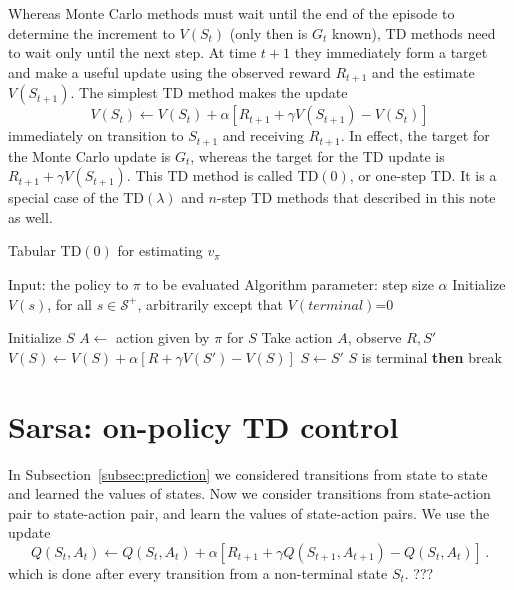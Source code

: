 \documentclass[12pt]{book}
\newcommand{\<}{\langle}
\renewcommand{\>}{\rangle}
\renewcommand{\S}{\mathcal{S}}
\begin{document}
Whereas Monte Carlo methods must wait until the end of the episode to determine the increment to $V(S_t)$ (only then is $G_t$ known), TD methods need to wait only until the next step.
At time $t+1$ they immediately form a target and make a useful update using the observed reward $R_{t+1}$ and the estimate $V(S_{t+1})$. The simplest TD method makes the update 
\begin{equation}
V(S_t) \leftarrow V(S_t) + \alpha [ R_{t+1} + \gamma V(S_{t+1}) - V(S_t)]
\end{equation}
immediately on transition to $S_{t+1}$ and receiving $R_{t+1}$. In effect, the target for the Monte Carlo update is $G_t$, whereas the target for the TD update is $R_{t+1} + \gamma V(S_{t+1})$. This TD method is called TD$(0)$, or one-step TD. It is a special case of the TD$(\lambda)$ and $n$-step TD methods that described in this note as well.

\begin{algorithm}
\caption{Tabular TD$(0)$ for estimating $v_\pi$}
\begin{algorithmic}
\State Input: the policy to $\pi$ to be evaluated
\State Algorithm parameter: step size $\alpha$
\State Initialize $V(s)$, for all $s\in\S^+$, arbitrarily except that $V(terminal)$=0

\medskip
{}
  \State Initialize $S$
    \State $A\leftarrow$ action given by $\pi$ for $S$
    \State Take action $A$, observe $R,S'$
    \State $V(S)\leftarrow V(S) + \alpha [R + \gamma V(S') - V(S)]$
    \State $S\leftarrow S'$
     $S$ is terminal {\bf then} break
  \EndFor
\EndFor
\end{algorithmic}
\end{algorithm}

%
%
%

\section{Sarsa: on-policy TD control}

In Subsection~\ref{subsec:prediction} we considered transitions from state to state and learned the values of states. Now we consider transitions from state-action pair to state-action pair, and learn the values of
state-action pairs. We use the update
\begin{equation}
Q(S_t,A_t)\leftarrow Q(S_t,A_t) + \alpha [R_{t+1} + \gamma Q(S_{t+1}, A_{t+1}) - Q(S_t, A_t)]\,.
\end{equation}
which is done after every transition from a non-terminal state $S_t$. ???
\end{document}

